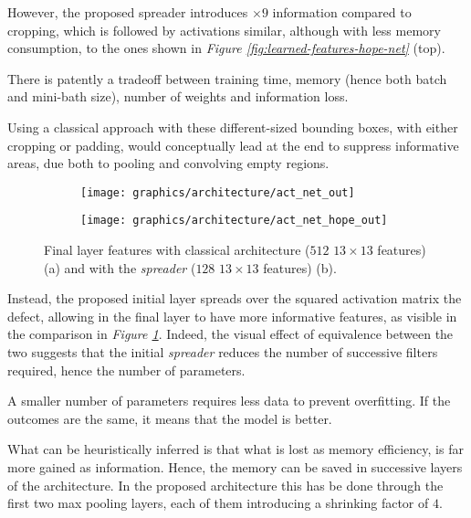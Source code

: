         \par{
            However, the proposed spreader introduces $\times 9$ information compared to cropping, which is followed by activations similar, although with less memory consumption, to the ones shown in \emph{Figure \ref{fig:learned-features-hope-net}} (top).
        }
        \par{
            There is patently a tradeoff between training time, memory (hence both batch and mini-bath size), number of weights and information loss.
        }
        \par{
            Using a classical approach with these different-sized bounding boxes, with either cropping or padding, would conceptually lead at the end to suppress informative areas, due both to pooling and convolving empty regions.
        }
        \begin{figure}
            \centering
            \begin{subfigure}{.5\linewidth}
                \centering
                \texttt{[image: graphics/architecture/act\_net\_out]}
                \caption{}
            \end{subfigure}\hfill
            \begin{subfigure}{.5\linewidth}
                \centering
                \texttt{[image: graphics/architecture/act\_net\_hope\_out]}
                \caption{}
            \end{subfigure}
            \caption{Final layer features with classical architecture ($512$ $13\times 13$ features) (a) and with the \emph{spreader} ($128$ $13\times 13$ features) (b).}
            \label{fig:features-last-layer}
        \end{figure}
        \par{
            Instead, the proposed initial layer spreads over the squared activation matrix the defect, allowing in the final layer to have more informative features, as visible in the comparison in \emph{Figure \ref{fig:features-last-layer}}. Indeed, the visual effect of equivalence between the two suggests that the initial \emph{spreader} reduces the number of successive filters required, hence the number of parameters. 
        }
        \par{
            A smaller number of parameters requires less data to prevent overfitting. If the outcomes are the same, it means that the model is better.
        }
        \par{
            What can be heuristically inferred is that what is lost as memory efficiency, is far more gained as information. Hence, the memory can be saved in successive layers of the architecture. In the proposed architecture this has be done through the first two max pooling layers, each of them introducing a shrinking factor of $4$.
        }
